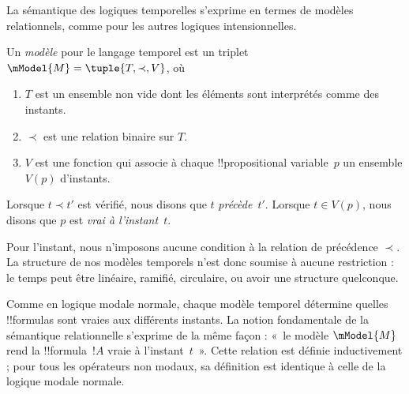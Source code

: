 \documentclass[../../../include/open-logic-section]{subfiles}
\begin{document}
La sémantique des logiques temporelles s'exprime en termes de modèles
relationnels, comme pour les autres logiques intensionnelles.

\begin{defn}
  Un \emph{modèle} pour le langage temporel est un triplet
  $\mModel{M} = \tuple{T, \prec, V}$, où
  \begin{enumerate}
  \item $T$ est un ensemble non vide dont les éléments sont
    interprétés comme des instants.
  \item $\prec$ est une relation binaire sur $T$.
  \item $V$ est une fonction qui associe à chaque !!{propositional
    variable}~$p$ un ensemble $V(p)$ d'instants.
  \end{enumerate}
  Lorsque $t \prec t'$ est vérifié, nous disons que $t$ \emph{précède}~$t'$.
  Lorsque $t \in V(p)$, nous disons que $p$ est \emph{vrai à l'instant}~$t$.
\end{defn}

Pour l'instant, nous n'imposons aucune condition à la relation de
précédence $\prec$. La structure de nos modèles temporels n'est donc
soumise à aucune restriction : le temps peut être linéaire, ramifié,
circulaire, ou avoir une structure quelconque.

Comme en logique modale normale, chaque modèle temporel détermine
quelles !!{formula}s sont vraies aux différents instants. La notion
fondamentale de la sémantique relationnelle s'exprime de la même
façon : «~le modèle $\mModel{M}$ rend la !!{formula}~$!A$ vraie à
l'instant~$t$~». Cette relation est définie inductivement ; pour tous
les opérateurs non modaux, sa définition est identique à celle de la
logique modale normale.
\end{document}
